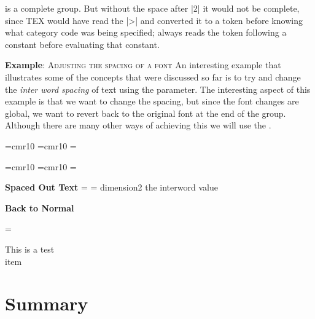 \begin{teX}
{\catcode` >
\end{teX}

is a complete group. But without the space after |2|  it would not be complete, since TEX
would have read the |>|  and converted it to a token before knowing what category code
was being specified; \tex always reads the token following a constant before evaluating
that constant.

\topline

\textbf{Example}: \textsc{Adjusting the spacing of a font} An interesting example that illustrates some of the concepts that were discussed so far is to try and change the \textit{inter word spacing} of text using the  parameter. The interesting aspect of this example is that
we want to change the spacing, but since the font changes are global, we want to revert back to the original font at the end of the group. Although there are many other ways of achieving this we will use the .

\begin{teX}
\font \roman=cmr10
\font\specroman=cmr10
\newdimen\savedvalue
\savedvalue=\roman
\newdimen\specialvalue
\specialvalue=13.0pt
\def \rm{%
  \fontdimen2\roman=\savedvalue }
\def\specrm{%
  \aftergroup\restoredimen
  \fontdimen2\specroman=\specialvalue
  \specroman  }
\def\restoredimen{%
\fontdimen2\roman=\savedvalue }
\end{teX}
{
\font \roman=cmr10
\font\specroman=cmr10
\newdimen\savedvalue
\savedvalue=\roman
\newdimen\specialvalue
\specialvalue=13.0pt
\def \rm{%
  \fontdimen2\roman=\savedvalue }
\def\specrm{%
  \aftergroup\restoredimen
  \fontdimen2\specroman=\specialvalue
  \specroman  }
\def\restoredimen{%
\roman=\savedvalue }


{\bf Spaced Out Text} 
\medskip
{\specrm \lorem} dimension2 the interword   value \the{}\font


{\bf  Back to Normal}
\medskip

\rm
\lorem

}

This is a test \\{item}
\section{Summary}
\relax\bgroup\relax\egroup\relax 


